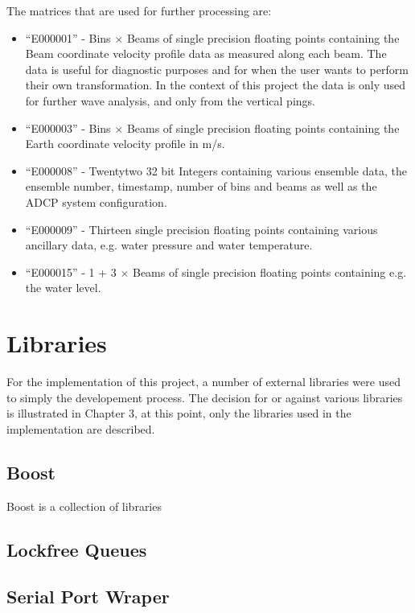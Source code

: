 The matrices that are used for further processing are:
\begin{itemize}
\item ``E000001'' - Bins $\times$ Beams of single precision floating points containing  the Beam coordinate velocity profile data as measured along each beam. The data is useful for diagnostic purposes and for when the user wants to perform their own transformation. In the context of this project the data is only used for further wave analysis, and only from the vertical pings.
\item``E000003'' - Bins $\times$ Beams of single precision floating points containing the Earth coordinate velocity profile in m/s. 
\item ``E000008'' - Twentytwo 32 bit Integers containing various ensemble data, the ensemble number, timestamp, number of bins and beams as well as the ADCP system configuration.
\item ``E000009'' - Thirteen single precision floating points containing various ancillary data, e.g. water pressure and water temperature.
\item ``E000015'' - 1 + 3 $\times$ Beams of single precision floating points containing e.g. the water level. 
\end{itemize}

\section{Libraries}
For the implementation of this project, a number of external libraries were used to simply the developement process. The decision for or against various libraries is illustrated in Chapter 3, at this point, only the libraries used in the implementation are described.
\subsection{Boost}
Boost is a collection of libraries
\subsection{Lockfree Queues}

\subsection{Serial Port Wraper}